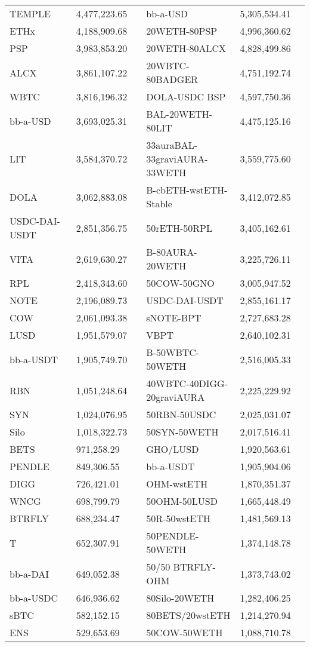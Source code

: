 \begin{longtable}{@{}p{0.25\linewidth}p{0.25\linewidth}p{0.25\linewidth}p{0.25\linewidth}@{}}
TEMPLE & 4,477,223.65 & bb-a-USD & 5,305,534.41 \\
ETHx & 4,188,909.68 & 20WETH-80PSP & 4,996,360.62 \\
PSP & 3,983,853.20 & 20WETH-80ALCX & 4,828,499.86 \\
ALCX & 3,861,107.22 & 20WBTC-80BADGER & 4,751,192.74 \\
WBTC & 3,816,196.32 & DOLA-USDC BSP & 4,597,750.36 \\
bb-a-USD & 3,693,025.31 & BAL-20WETH-80LIT & 4,475,125.16 \\
LIT & 3,584,370.72 & 33auraBAL-33graviAURA-33WETH & 3,559,775.60 \\
DOLA & 3,062,883.08 & B-cbETH-wstETH-Stable & 3,412,072.85 \\
USDC-DAI-USDT & 2,851,356.75 & 50rETH-50RPL & 3,405,162.61 \\
VITA & 2,619,630.27 & B-80AURA-20WETH & 3,225,726.11 \\
RPL & 2,418,343.60 & 50COW-50GNO & 3,005,947.52 \\
NOTE & 2,196,089.73 & USDC-DAI-USDT & 2,855,161.17 \\
COW & 2,061,093.38 & sNOTE-BPT & 2,727,683.28 \\
LUSD & 1,951,579.07 & VBPT & 2,640,102.31 \\
bb-a-USDT & 1,905,749.70 & B-50WBTC-50WETH & 2,516,005.33 \\
RBN & 1,051,248.64 & 40WBTC-40DIGG-20graviAURA & 2,225,229.92 \\
SYN & 1,024,076.95 & 50RBN-50USDC & 2,025,031.07 \\
Silo & 1,018,322.73 & 50SYN-50WETH & 2,017,516.41 \\
BETS & 971,258.29 & GHO/LUSD & 1,920,563.61 \\
PENDLE & 849,306.55 & bb-a-USDT & 1,905,904.06 \\
DIGG & 726,421.01 & OHM-wstETH & 1,870,351.37 \\
WNCG & 698,799.79 & 50OHM-50LUSD & 1,665,448.49 \\
BTRFLY & 688,234.47 & 50R-50wstETH & 1,481,569.13 \\
T & 652,307.91 & 50PENDLE-50WETH & 1,374,148.78 \\
bb-a-DAI & 649,052.38 & 50/50 BTRFLY-OHM & 1,373,743.02 \\
bb-a-USDC & 646,936.62 & 80Silo-20WETH & 1,282,406.25 \\
sBTC & 582,152.15 & 80BETS/20wstETH & 1,214,270.94 \\
ENS & 529,653.69 & 50COW-50WETH & 1,088,710.78 \\

\end{longtable}
